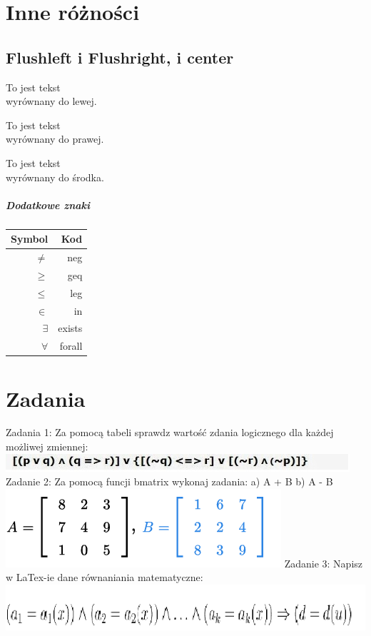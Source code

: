 \documentclass[a4paper, 11pt]{article}
\begin{document}
\section{Inne różności}
\subsection{Flushleft i Flushright, i center}
\begin{flushleft}
To jest tekst\\
wyrównany do lewej.\\
\end{flushleft}
\begin{flushright}
To jest tekst\\
wyrównany do prawej.\\
\end{flushright}
\begin{center}
To jest tekst\\
wyrównany do środka.\\
\end{center}
\subparagraph{Dodatkowe znaki}
\begin{tabular}{| r | r |}
\hline
Symbol & Kod \\
\hline
$ \neq $ & neg \\
\hline
$ \geq $ & geq \\
\hline
$ \leq $ & leg \\
\hline
$ \in $ & in \\
\hline
$ \exists $ & exists \\
\hline
$ \forall $ & forall \\
\hline
\end{tabular}
\section{Zadania}
Zadania 1:\newline
Za pomocą tabeli sprawdz wartość zdania logicznego dla każdej możliwej zmiennej: \newline
\includegraphics{zadanie1}
\newline
Zadanie 2:
Za pomocą funcji bmatrix wykonaj zadania: \newline
a) A + B\newline
b) A - B\newline
\includegraphics{zadanie2}\newline
Zadanie 3: \newline
Napisz w LaTex-ie dane równaniania matematyczne: \newline
\includegraphics{zadanie3}\newline
\end{document}
